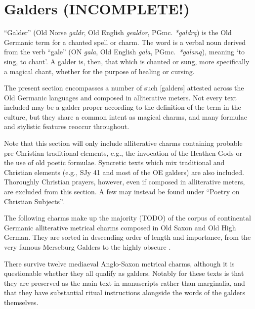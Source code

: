 \part{Galders (INCOMPLETE!)}


“Galder” (Old Norse \emph{galdr}, Old English \emph{gealdor}, PGmc. \emph{*galdrą}) is the Old Germanic term for a chanted spell or charm.  The word is a verbal noun derived from the verb “gale” (ON \emph{gala}, Old English \emph{gala}, PGmc.~\emph{*galaną}), meaning ‘to sing, to chant’.  A galder is, then, that which is chanted or sung, more specifically a magical chant, whether for the purpose of healing or cursing.

The present section encompasses a number of such [galders] attested across the Old Germanic languages and composed in alliterative meters.  Not every text included may be a galder proper according to the definition of the term in the culture, but they share a common intent as magical charms, and many formulae and stylistic features reoccur throughout.

Note that this section will only include alliterative charms containing probable pre-Christian traditional elements, e.g., the invocation of the Heathen Gods or the use of old poetic formulae.  Syncretic texts which mix traditional and Christian elements (e.g., SJy 41 and most of the OE galders) are also included.  Thoroughly Christian prayers, however, even if composed in alliterative meters, are excluded from this section.  A few may instead be found under “Poetry on Christian Subjects”.


The following charms make up the majority (TODO) of the corpus of continental Germanic alliterative metrical charms composed in Old Saxon and Old High German.  They are sorted in descending order of length and importance, from the very famous Merseburg Galders to the highly obscure \Chnospinci.

\newpage


\newpage

\newpage



There survive twelve mediaeval Anglo-Saxon metrical charms, although it is questionable whether they all qualify as galders.  Notably for these texts is that they are preserved as the main text in manuscripts rather than marginalia, and that they have substantial ritual instructions alongside the words of the galders themselves.

